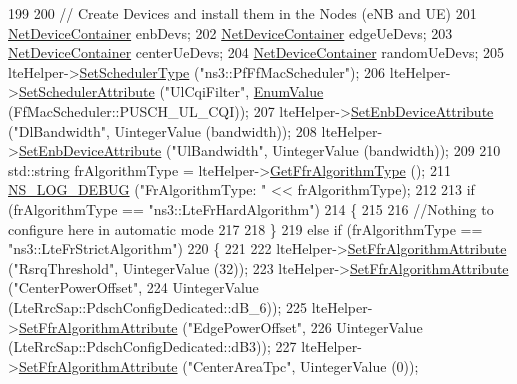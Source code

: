 \begin{DoxyCode}
199 
200   \textcolor{comment}{// Create Devices and install them in the Nodes (eNB and UE)}
201   \hyperlink{classns3_1_1NetDeviceContainer}{NetDeviceContainer} enbDevs;
202   \hyperlink{classns3_1_1NetDeviceContainer}{NetDeviceContainer} edgeUeDevs;
203   \hyperlink{classns3_1_1NetDeviceContainer}{NetDeviceContainer} centerUeDevs;
204   \hyperlink{classns3_1_1NetDeviceContainer}{NetDeviceContainer} randomUeDevs;
205   lteHelper->\hyperlink{classns3_1_1LteHelper_a8f86e55b8b80a81732c4b2df00fb25d5}{SetSchedulerType} (\textcolor{stringliteral}{"ns3::PfFfMacScheduler"});
206   lteHelper->\hyperlink{classns3_1_1LteHelper_a38f8c7f4592b31c0f3dedb53e7909742}{SetSchedulerAttribute} (\textcolor{stringliteral}{"UlCqiFilter"}, 
      \hyperlink{classns3_1_1EnumValue}{EnumValue} (FfMacScheduler::PUSCH\_UL\_CQI));
207   lteHelper->\hyperlink{classns3_1_1LteHelper_ac42f0f3d6cd8473d810bfbbeb5d592e0}{SetEnbDeviceAttribute} (\textcolor{stringliteral}{"DlBandwidth"}, UintegerValue (bandwidth));
208   lteHelper->\hyperlink{classns3_1_1LteHelper_ac42f0f3d6cd8473d810bfbbeb5d592e0}{SetEnbDeviceAttribute} (\textcolor{stringliteral}{"UlBandwidth"}, UintegerValue (bandwidth));
209 
210   std::string frAlgorithmType = lteHelper->\hyperlink{classns3_1_1LteHelper_a4512795e75ecff30e9eeca0d26589614}{GetFfrAlgorithmType} ();
211   \hyperlink{group__logging_ga413f1886406d49f59a6a0a89b77b4d0a}{NS\_LOG\_DEBUG} (\textcolor{stringliteral}{"FrAlgorithmType: "} << frAlgorithmType);
212 
213   \textcolor{keywordflow}{if} (frAlgorithmType == \textcolor{stringliteral}{"ns3::LteFrHardAlgorithm"})
214     \{
215 
216       \textcolor{comment}{//Nothing to configure here in automatic mode}
217 
218     \}
219   \textcolor{keywordflow}{else} \textcolor{keywordflow}{if} (frAlgorithmType == \textcolor{stringliteral}{"ns3::LteFrStrictAlgorithm"})
220     \{
221 
222       lteHelper->\hyperlink{classns3_1_1LteHelper_a793d56e843a844428851e90752c5f130}{SetFfrAlgorithmAttribute} (\textcolor{stringliteral}{"RsrqThreshold"}, UintegerValue (32));
223       lteHelper->\hyperlink{classns3_1_1LteHelper_a793d56e843a844428851e90752c5f130}{SetFfrAlgorithmAttribute} (\textcolor{stringliteral}{"CenterPowerOffset"},
224                                            UintegerValue (LteRrcSap::PdschConfigDedicated::dB\_6));
225       lteHelper->\hyperlink{classns3_1_1LteHelper_a793d56e843a844428851e90752c5f130}{SetFfrAlgorithmAttribute} (\textcolor{stringliteral}{"EdgePowerOffset"},
226                                            UintegerValue (LteRrcSap::PdschConfigDedicated::dB3));
227       lteHelper->\hyperlink{classns3_1_1LteHelper_a793d56e843a844428851e90752c5f130}{SetFfrAlgorithmAttribute} (\textcolor{stringliteral}{"CenterAreaTpc"}, UintegerValue (0));

\end{DoxyCode}
